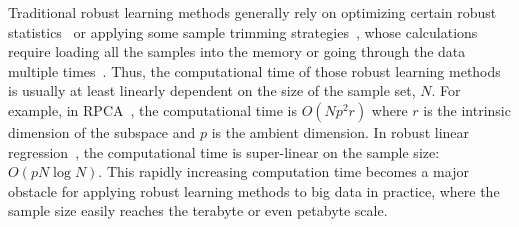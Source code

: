 \documentclass[11pt]{article}
\begin{document}


Traditional robust learning methods generally rely on optimizing certain robust statistics~\cite{maronna1998robust,HR-PCA} or applying some sample trimming strategies~\cite{donoho1992breakdown}, whose calculations require loading all the samples into the memory or going through the data multiple times~\cite{feng2013stochastic}. Thus, the computational time of those robust learning methods is usually at least linearly dependent on the size of the sample set, $N$. 
For example, in RPCA~\cite{HR-PCA}, the computational time is $O(Np^2r)$ where $r$ is the intrinsic dimension of the subspace and $ p $ is the ambient dimension. In robust linear regression~\cite{chen2013noisy}, the computational time is super-linear on the sample size: $O(pN\log N)$. This rapidly increasing computation time becomes a major obstacle for applying robust learning methods to big data in practice, where the sample size easily reaches the terabyte or even petabyte scale.
\end{document}
